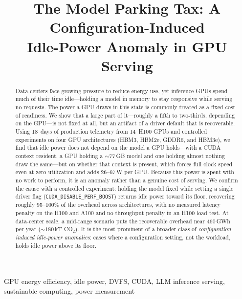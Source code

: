 \documentclass[conference]{IEEEtran}
\newcommand{\perfboost}{\texttt{\mbox{CUDA}\_\hspace{0pt}\mbox{DISABLE}\_\hspace{0pt}\mbox{PERF}\_\hspace{0pt}\mbox{BOOST}}\xspace}
\begin{document}
\title{The Model Parking Tax: A Configuration-Induced\\ Idle-Power Anomaly in GPU Serving}

\author{
}

\maketitle

\begin{abstract}
Data centers face growing pressure to reduce energy use, yet inference GPUs spend much of their time idle---holding a model in memory to stay responsive while serving no requests. The power a GPU draws in this state is commonly treated as a fixed cost of readiness. We show that a large part of it---roughly a fifth to two-thirds, depending on the GPU---is not fixed at all, but an artifact of a driver default that is recoverable. Using 18~days of production telemetry from 14~H100 GPUs and controlled experiments on four GPU architectures (HBM3, HBM2e, GDDR6, and HBM3e), we find that idle power does not depend on the model a GPU holds---with a CUDA context resident, a GPU holding a ${\sim}77$\,GB model and one holding almost nothing draw the same---but on whether that context is present, which forces full clock speed even at zero utilization and adds 26--67\,W per GPU. Because this power is spent with no work to perform, it is an anomaly rather than a genuine cost of serving. We confirm the cause with a controlled experiment: holding the model fixed while setting a single driver flag (\perfboost) returns idle power toward its floor, recovering roughly 95--100\% of the overhead across architectures, with no measured latency penalty on the H100 and A100 and no throughput penalty in an H100 load test. At data-center scale, a mid-range scenario puts the recoverable overhead near \num{460}\,GWh per year (${\sim}180$\,kT CO$_2$). It is the most prominent of a broader class of \emph{configuration-induced idle-power anomalies}: cases where a configuration setting, not the workload, holds idle power above its floor.
\end{abstract}

\begin{IEEEkeywords}
GPU energy efficiency, idle power, DVFS, CUDA, LLM inference serving, sustainable computing, power measurement
\end{IEEEkeywords}
\end{document}
